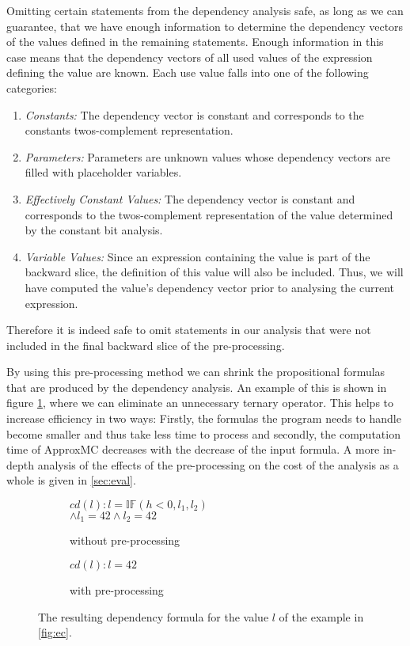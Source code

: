 Omitting certain statements from the dependency analysis safe, as long as we can guarantee, that we have enough information to determine the dependency vectors of the values defined in the remaining statements. Enough information in this case means that the dependency vectors of all used values of the expression defining the value are known. Each use value falls into one of the following categories:
\begin{enumerate}
    \item \emph{Constants: }The dependency vector is constant and corresponds to the constants twos-complement representation.
    \item \emph{Parameters: }Parameters are unknown values whose dependency vectors are filled with placeholder variables.
    \item \emph{Effectively Constant Values: }The dependency vector is constant and corresponds to the twos-complement representation of the value determined by the constant bit analysis.
    \item \emph{Variable Values: }Since an expression containing the value is part of the backward slice, the definition of this value will also be included. Thus, we will have computed the value's dependency vector prior to analysing the current expression.
\end{enumerate}
Therefore it is indeed safe to omit statements in our analysis that were not included in the final backward slice of the pre-processing.

By using this pre-processing method we can shrink the propositional formulas that are produced by the dependency analysis. An example of this is shown in figure \ref{fig:ppRes}, where we can eliminate an unnecessary ternary operator. This helps to increase efficiency in two ways: Firstly, the formulas the program needs to handle become smaller and thus take less time to process and secondly, the computation time of ApproxMC decreases with the decrease of the input formula. A more in-depth analysis of the effects of the pre-processing on the cost of the analysis as a whole is given in \ref{sec:eval}. 

\begin{figure}
    \begin{subfigure}[t]{.4\textwidth}
        \centering
        $cd(l) : l = \mathbb{IF}(h < 0, l_1, l_2)$ \\ $\land l_1 = 42 \land l_2 = 42$
        \caption{without pre-processing}
    \end{subfigure}
    \hfill
    \begin{subfigure}[t]{.4\textwidth}
        \centering
        $cd(l) : l = 42$
        \vspace{\baselineskip}
        \caption{with pre-processing}
    \end{subfigure}
    \caption{The resulting dependency formula for the value $l$ of the example in \ref{fig:ec}. }
    \label{fig:ppRes}
\end{figure}